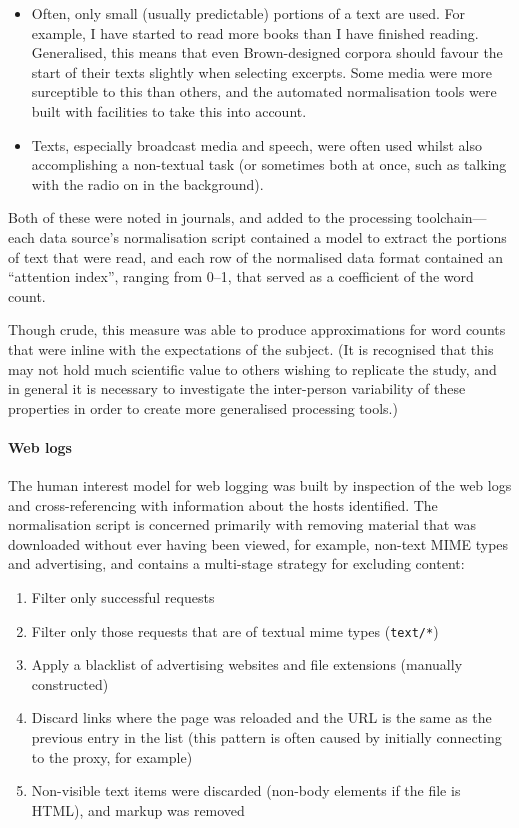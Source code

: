\begin{itemize}
    \item Often, only small (usually predictable) portions of a text are used.  For example, I have started to read more books than I have finished reading.  Generalised, this means that even Brown-designed corpora should favour the start of their texts slightly when selecting excerpts.  Some media were more surceptible to this than others, and the automated normalisation tools were built with facilities to take this into account.
    \item Texts, especially broadcast media and speech, were often used whilst also accomplishing a non-textual task (or sometimes both at once, such as talking with the radio on in the background).
\end{itemize}

Both of these were noted in journals, and added to the processing toolchain---each data source's normalisation script contained a model to extract the portions of text that were read, and each row of the normalised data format contained an ``attention index'', ranging from 0--1, that served as a coefficient of the word count.

Though crude, this measure was able to produce approximations for word counts that were inline with the expectations of the subject.  (It is recognised that this may not hold much scientific value to others wishing to replicate the study, and in general it is necessary to investigate the inter-person variability of these properties in order to create more generalised processing tools.)


\paragraph{Web logs}
The human interest model for web logging was built by inspection of the web logs and cross-referencing with information about the hosts identified.  The normalisation script is concerned primarily with removing material that was downloaded without ever having been viewed, for example, non-text MIME types and advertising, and contains a multi-stage strategy for excluding content:

\begin{enumerate}
    \item Filter only successful requests
    \item Filter only those requests that are of textual mime types (\texttt{text/*})
    \item Apply a blacklist of advertising websites and file extensions (manually constructed)
    \item Discard links where the page was reloaded and the URL is the same as the previous entry in the list (this pattern is often caused by initially connecting to the proxy, for example)
    \item Non-visible text items were discarded (non-body elements if the file is HTML), and markup was removed
\end{enumerate}

